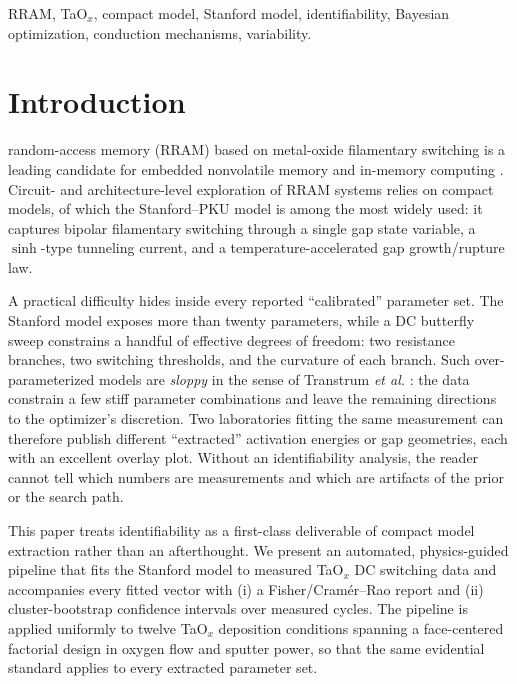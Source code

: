 \documentclass[journal]{IEEEtran}
\begin{document}
\begin{IEEEkeywords}
RRAM, TaO$_x$, compact model, Stanford model, identifiability, Bayesian
optimization, conduction mechanisms, variability.
\end{IEEEkeywords}

\IEEEpeerreviewmaketitle

\section{Introduction}

 random-access memory (RRAM) based on metal-oxide
filamentary switching is a leading candidate for embedded nonvolatile memory
and in-memory computing \cite{wong2012metal,ielmini2018inmemory}.  Circuit-
and architecture-level exploration of RRAM systems relies on compact models,
of which the Stanford--PKU model \cite{guan2012spice,jiang2016verification}
is among the most widely used: it captures bipolar filamentary switching
through a single gap state variable, a $\sinh$-type tunneling current, and a
temperature-accelerated gap growth/rupture law.

A practical difficulty hides inside every reported ``calibrated'' parameter
set.  The Stanford model exposes more than twenty parameters, while a DC
butterfly sweep constrains a handful of effective degrees of freedom: two
resistance branches, two switching thresholds, and the curvature of each
branch.  Such over-parameterized models are \emph{sloppy} in the sense of
Transtrum \emph{et al.} \cite{transtrum2015sloppiness}: the data constrain a
few stiff parameter combinations and leave the remaining directions to the
optimizer's discretion.  Two laboratories fitting the same measurement can
therefore publish different ``extracted'' activation energies or gap
geometries, each with an excellent overlay plot.  Without an identifiability
analysis, the reader cannot tell which numbers are measurements and which are
artifacts of the prior or the search path.

This paper treats identifiability as a first-class deliverable of compact
model extraction rather than an afterthought.  We present an automated,
physics-guided pipeline that fits the Stanford model to measured TaO$_x$
DC switching data and accompanies every fitted vector with (i) a
Fisher/Cram\'er--Rao report and (ii) cluster-bootstrap confidence intervals
over measured cycles.  The pipeline is applied uniformly to twelve TaO$_x$ deposition
conditions spanning a face-centered factorial design in oxygen flow and
sputter power, so that the same evidential standard applies to every
extracted parameter set.
\end{document}
